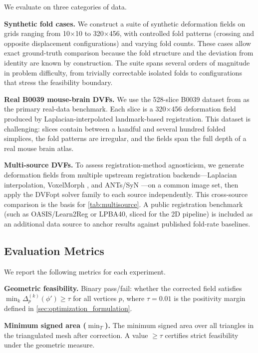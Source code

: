 \documentclass[lettersize,journal]{IEEEtran}
\begin{document}
We evaluate on three categories of data.

\textbf{Synthetic fold cases.} We construct a suite of synthetic deformation fields on grids ranging from 10$\times$10 to 320$\times$456, with controlled fold patterns (crossing and opposite displacement configurations) and varying fold counts. These cases allow exact ground-truth comparison because the fold structure and the deviation from identity are known by construction. The suite spans several orders of magnitude in problem difficulty, from trivially correctable isolated folds to configurations that stress the feasibility boundary.

\textbf{Real B0039 mouse-brain DVFs.} We use the 528-slice B0039 dataset from \cite{RegBoost2025} as the primary real-data benchmark. Each slice is a 320$\times$456 deformation field produced by Laplacian-interpolated landmark-based registration. This dataset is challenging: slices contain between a handful and several hundred folded simplices, the fold patterns are irregular, and the fields span the full depth of a real mouse brain atlas.

\textbf{Multi-source DVFs.} To assess registration-method agnosticism, we generate deformation fields from multiple upstream registration backends—Laplacian interpolation, VoxelMorph \cite{VoxelMorph2019}, and ANTs/SyN \cite{AVANTS200826}—on a common image set, then apply the DVFopt solver family to each source independently. This cross-source comparison is the basis for \autoref{tab:multisource}. A public registration benchmark (such as OASIS/Learn2Reg \cite{learn2reg2023} or LPBA40, sliced for the 2D pipeline) is included as an additional data source to anchor results against published fold-rate baselines.

\subsection{Evaluation Metrics}
\label{sec:metrics}

We report the following metrics for each experiment.

\textbf{Geometric feasibility.} Binary pass/fail: whether the corrected field satisfies $\min_k \Delta^{(k)}_p(\phi') \geq \tau$ for all vertices $p$, where $\tau = 0.01$ is the positivity margin defined in \autoref{sec:optimization_formulation}.

\textbf{Minimum signed area ($\min_T$).} The minimum signed area over all triangles in the triangulated mesh after correction. A value $\geq \tau$ certifies strict feasibility under the geometric measure.
\end{document}
